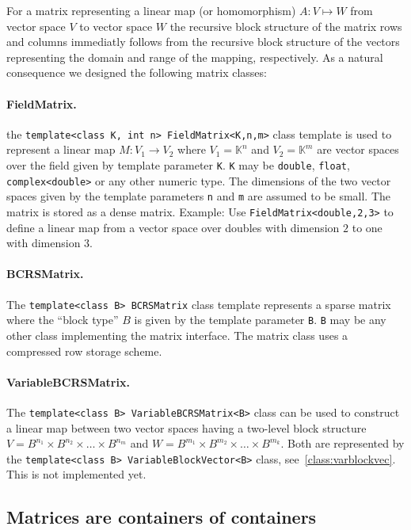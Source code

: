 \documentclass[11pt]{article}
\newcommand{\K}{\mathbb{K}}
\begin{document}
For a matrix representing a linear map (or homomorphism) $A: V \mapsto
W$ from vector space $V$ to vector space $W$ the recursive block
structure of the matrix rows and columns immediatly follows
 from the recursive block structure of the vectors representing
the domain and range of the mapping, respectively. As a natural
consequence we designed the following matrix classes:

\paragraph{FieldMatrix.}
the \lstinline!template<class K, int n> FieldMatrix<K,n,m>! class
template is used to represent a linear map $M: V_1 \to V_2$ where
$V_1=\K^n$ and $V_2=\K^m$ are vector spaces over the field given by
template parameter \lstinline!K!. \lstinline!K! may be \lstinline!double!, \lstinline!float!,
\lstinline!complex<double>! or any other numeric type.
The dimensions of the two vector spaces  given by the template parameters
\lstinline!n! and \lstinline!m! are assumed to be small. The matrix is
stored as a dense matrix.
Example: Use \lstinline!FieldMatrix<double,2,3>! to define a linear
map from a vector space over doubles with dimension $2$ to one with
dimension $3$.

\paragraph{BCRSMatrix.}
The \lstinline!template<class B> BCRSMatrix! class template represents
a sparse matrix where the ``block type'' $B$ is given by the template
parameter \lstinline!B!. \lstinline!B! may be any other class
implementing the matrix interface.  The matrix class uses
a compressed row storage scheme.

\paragraph{VariableBCRSMatrix.}

The \lstinline!template<class B> VariableBCRSMatrix<B>! class can be
used to construct a linear map between two vector spaces having a two-level
block structure $V=B^{n_1}\times B^{n_2}\times\ldots \times B^{n_m}$
and $W=B^{m_1}\times B^{m_2}\times\ldots \times B^{m_k}$. Both are
represented by the 
\lstinline!template<class B> VariableBlockVector<B>! class,
see~\ref{class:varblockvec}. This is not implemented yet.

\subsection[Matrix containers]{Matrices are containers of containers}
\end{document}
